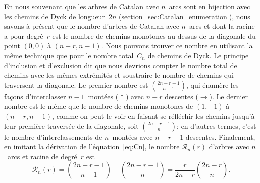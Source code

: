 En nous souvenant que les arbres de Catalan avec \(n\)~arcs sont en
bijection avec les chemins de Dyck de longueur~\(2n\)
(section~\vref{sec:Catalan_enumeration}), nous savons à présent que le
nombre d'arbres de Catalan avec \(n\)~arcs et dont la racine a pour
degré~\(r\) est le nombre de chemins monotones au-dessus de la
diagonale du point \((0,0)\) à \((n-r,n-1)\). Nous pouvons trouver ce
nombre en utilisant la même technique que pour le nombre total~\(C_n\)
de chemins de Dyck. Le principe d'inclusion et d'exclusion dit que
nous devrions compter le nombre total de chemins avec les mêmes
extrémités et soustraire le nombre de chemins qui traversent la
diagonale. Le premier nombre est \(\binom{2n-r-1}{n-1}\), qui énumère
les façons d'interclasser \(n-1\)~montées (\(\uparrow\)) avec \(n-r\)
descentes (\(\rightarrow\)). Le dernier nombre est le même que le
nombre de chemins monotones de \((1,-1)\) à \((n-r,n-1)\), comme on
peut le voir en faisant se réfléchir les chemins jusqu'à leur première
traversée de la diagonale, soit \(\binom{2n-r-1}{n}\); en d'autres
termes, c'est le nombre d'interclassements de \(n\)~montées avec
\(n-r-1\) descentes. Finalement, en imitant la dérivation de
l'équation~\eqref{eq:Cn}, le nombre \(\mathcal{R}_n(r)\) d'arbres avec
\(n\)~arcs et racine de degré~\(r\) est
\begin{equation*}
\mathcal{R}_n(r) = \binom{2n-r-1}{n-1} - \binom{2n-r-1}{n}
                 = \frac{r}{2n-r} \binom{2n-r}{n}.
\end{equation*}

